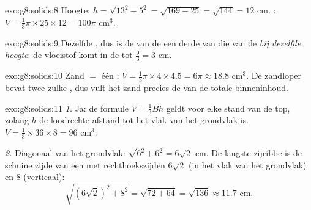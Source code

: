 \begin{solution}{exo:g8:solids:8}
Hoogte: $h = \sqrt{13^2 - 5^2} = \sqrt{169 - 25} = \sqrt{144} = 12$ cm. :
$V = \frac13 \pi \times 25 \times 12 = 100\pi$ cm$^3$.
\end{solution}

\begin{solution}{exo:g8:solids:9}
Dezelfde , dus is de  van de  een derde van die van de 
\emph{bij dezelfde hoogte}: de vloeistof komt in de  tot
$\frac{9}{3} = 3$ cm.
\end{solution}

\begin{solution}{exo:g8:solids:10}
Zand $=$ één : $V = \frac13 \pi \times 4 \times 4.5 = 6\pi \approx 18.8$
cm$^3$. De zandloper bevat twee zulke , dus vult het zand precies de 
van de totale binneninhoud.
\end{solution}

\begin{solution}{exo:g8:solids:11}
\emph{1.} Ja: de formule $V = \frac13 Bh$ geldt voor elke stand van de top, zolang
$h$ de loodrechte afstand tot het vlak van het grondvlak is.
$V = \frac13 \times 36 \times 8 = 96$ cm$^3$.

\emph{2.} Diagonaal van het grondvlak: $\sqrt{6^2 + 6^2} = 6\sqrt2$ cm. De
langste zijribbe is de schuine zijde van een  met
rechthoekszijden $6\sqrt2$ (in het vlak van het grondvlak) en $8$ (verticaal):
\[
\sqrt{(6\sqrt2)^2 + 8^2} = \sqrt{72 + 64} = \sqrt{136} \approx 11.7
\text{ cm}.
\]
\end{solution}

